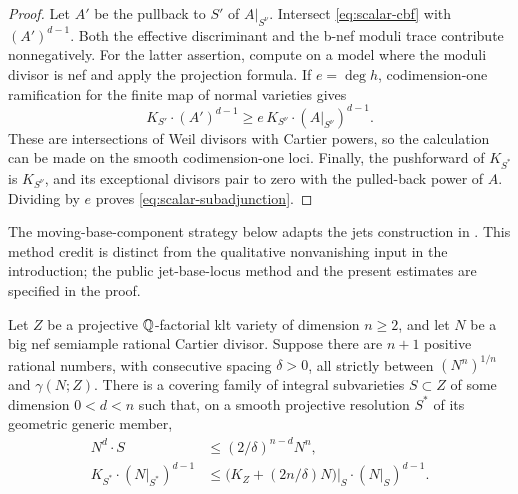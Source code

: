 \begin{proof}
Let $A'$ be the pullback to $S'$ of $A|_{S^\nu}$.  Intersect
\eqref{eq:scalar-cbf} with $(A')^{d-1}$.  Both the effective discriminant
and the b-nef moduli trace contribute nonnegatively.  For the latter
assertion, compute on a model where the moduli divisor is nef and apply
the projection formula.  If $e=\deg h$, codimension-one ramification
for the finite map of normal varieties gives
\[
 K_{S'}\cdot(A')^{d-1}
 \ge e\,K_{S^\nu}\cdot(A|_{S^\nu})^{d-1}.
\]
These are intersections of Weil divisors with Cartier powers, so the
calculation can be made on the smooth codimension-one loci.  Finally,
the pushforward of $K_{S^*}$ is $K_{S^\nu}$, and its exceptional
divisors pair to zero with the pulled-back power of $A$.  Dividing by
$e$ proves \eqref{eq:scalar-subadjunction}.
\end{proof}

The moving-base-component strategy below adapts the jets construction in
\cite[Sections~7--8]{OpenAIAbundance}.  This method credit is distinct
from the qualitative nonvanishing input in the introduction; the public
jet-base-locus method and the present estimates are specified in the proof.

\begin{lemma}\label{lem:scalar-tracking}
Let $Z$ be a projective $\mathbb Q$-factorial klt variety of dimension $n\ge2$,
and let $N$ be a big nef semiample rational Cartier divisor.  Suppose
there are $n+1$ positive rational numbers, with consecutive spacing
$\delta>0$, all strictly between $(N^n)^{1/n}$ and $\gamma(N;Z)$.
There is a covering family of integral subvarieties $S\subset Z$ of
some dimension $0<d<n$ such that, on a smooth projective resolution
$S^*$ of its geometric generic member,
\begin{align}
 N^d\cdot S&\le (2/\delta)^{n-d}N^n,
       \label{eq:scalar-track-degree}\\
 K_{S^*}\cdot(N|_{S^*})^{d-1}
 &\le \bigl(K_Z+(2n/\delta)N\bigr)|_S
             \cdot(N|_S)^{d-1}.
       \label{eq:scalar-track-canonical}
\end{align}
\end{lemma}

